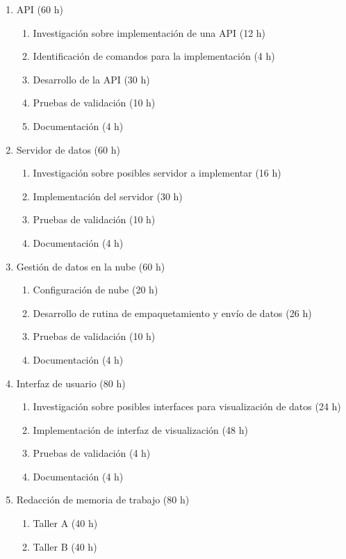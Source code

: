 \documentclass[
11pt, %
codirector, %
]{charter}
\begin{document}
\begin{enumerate}
\item API (60 h)
	\begin{enumerate}
	\item Investigación sobre implementación de una API (12 h)
	\item Identificación de comandos para la implementación (4 h)
	\item Desarrollo de la API (30 h)
	\item Pruebas de validación (10 h)
	\item Documentación (4 h)
	\end{enumerate}

\item Servidor de datos (60 h)
	\begin{enumerate}
	\item Investigación sobre posibles servidor a implementar (16 h)	
	\item Implementación del servidor (30 h)
	\item Pruebas de validación (10 h)
	\item Documentación (4 h)
	\end{enumerate}
	
\item Gestión de datos en la nube (60 h)
	\begin{enumerate}
	\item Configuración de nube (20 h)
	\item Desarrollo de rutina de empaquetamiento y envío de datos (26 h)
	\item Pruebas de validación (10 h)
	\item Documentación (4 h)
	\end{enumerate}	

\item Interfaz de usuario (80 h)
	\begin{enumerate}
	\item Investigación sobre posibles interfaces para visualización de datos (24 h)
	\item Implementación de interfaz de visualización (48 h)
	\item Pruebas de validación (4 h)
	\item Documentación (4 h)
	\end{enumerate}		

\item Redacción de memoria de trabajo (80 h)
	\begin{enumerate}
	\item Taller A (40 h)
	\item Taller B (40 h)
	\end{enumerate}

	
\end{enumerate}
\end{document}

